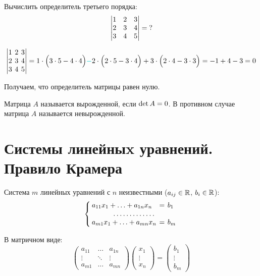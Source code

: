 \documentclass[a4paper,12pt]{article}
\begin{document}
  \begin{problem}[14.7(6)]
    Вычислить определитель третьего порядка:
    \[
      \begin{vmatrix}
        1 & 2 & 3\\
        2 & 3 & 4\\
        3 & 4 & 5
      \end{vmatrix} = \operatorname{?}
    \]
  \end{problem}
  
  \begin{solution}
    \[
      \begin{vmatrix}
        1 & 2 & 3\\
        2 & 3 & 4\\
        3 & 4 & 5
      \end{vmatrix}
      = 1 \cdot \Bigl(3 \cdot 5 - 4 \cdot 4\Bigr)
        \textcolor{light-cyan}{-} 2 \cdot \Bigl(2 \cdot 5 - 3 \cdot 4\Bigr)
        + 3 \cdot \Bigl(2 \cdot 4 - 3 \cdot 3\Bigr)
      = -1 + 4 - 3
      = 0
    \]
    
    Получаем, что определитель матрицы равен нулю.
  \end{solution}
  
  \begin{definition}
    Матрица $A$ называется вырожденной, если $\det A \hm= 0$.
    В противном случае матрица $A$ называется невырожденной.
  \end{definition}
  
  
  
  \section{Системы линейныx уравнений. Правило Крамера}
  
  Система $m$ линейных уравнений с $n$ неизвестными ($a_{ij} \hm\in \RR$, $b_i \hm\in \RR$):
  \[
    \renewcommand{\arraycolsep}{2pt}
    \left\{
      \begin{array}{lcl}
        a_{11} x_1 + \ldots + a_{1n} x_n & = & b_1\\
        \hdotsfor{3}\\
        a_{m1} x_1 + \ldots + a_{mn} x_n & = & b_m
      \end{array}
    \right.
  \]
  
  В матричном виде:
  \[
    \begin{pmatrix}
      a_{11} & \ldots & a_{1n}\\
      \vdots & \ddots & \vdots\\
      a_{m1} & \ldots & a_{mn}
    \end{pmatrix}
    \begin{pmatrix}
      x_1\\
      \vdots\\
      x_n
    \end{pmatrix}
    =
    \begin{pmatrix}
      b_1\\
      \vdots\\
      b_m
    \end{pmatrix}
  \]
  
\end{document}
